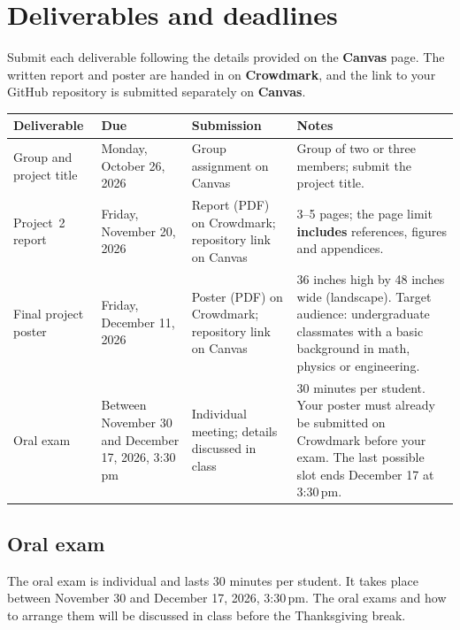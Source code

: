 \documentclass[11pt,a4paper]{article}
\begin{document}
\section*{Deliverables and deadlines}
Submit each deliverable following the details provided on the
\textbf{Canvas} page. The written report and poster are handed in on
\textbf{Crowdmark}, and the link to your GitHub repository is submitted
separately on \textbf{Canvas}.

\begin{center}
\small
\renewcommand{\arraystretch}{1.35}
\begin{tabularx}{\textwidth}{|>{\raggedright\arraybackslash}p{2.5cm}|>{\raggedright\arraybackslash}p{3.0cm}|>{\raggedright\arraybackslash}p{3.0cm}|L|}
\hline
\textbf{Deliverable} & \textbf{Due} & \textbf{Submission} & \textbf{Notes} \\
\hline\hline
Group and project title & Monday, October 26, 2026 &
  Group assignment on Canvas &
  Group of two or three members; submit the project title. \\
\hline
Project~2 report & Friday, November 20, 2026 &
  Report (PDF) on Crowdmark; repository link on Canvas &
  3--5 pages; the page limit \textbf{includes} references, figures and
  appendices. \\
\hline
Final project poster & Friday, December 11, 2026 &
  Poster (PDF) on Crowdmark; repository link on Canvas &
  36 inches high by 48 inches wide (landscape). Target audience:
  undergraduate classmates with a basic background in math, physics or
  engineering. \\
\hline
Oral exam & Between November 30 and December 17, 2026, 3:30\,pm &
  Individual meeting; details discussed in class &
  30 minutes per student. Your poster must already be submitted on
  Crowdmark before your exam. The last possible slot ends December 17 at
  3:30\,pm. \\
\hline
\end{tabularx}
\end{center}

\subsection*{Oral exam}
The oral exam is individual and lasts 30 minutes per student. It takes place
between November 30 and December 17, 2026, 3:30\,pm. The oral exams and how
to arrange them will be discussed in class before the Thanksgiving break.
\end{document}
